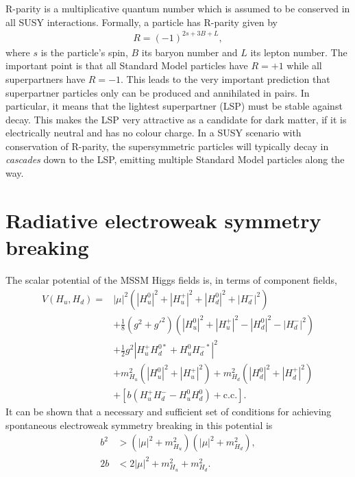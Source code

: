 \documentclass[twoside,english]{uiofysmaster}
\begin{document}
R-parity is a multiplicative quantum number which is assumed to be conserved in all SUSY interactions. Formally, a particle has R-parity given by
\begin{align}
	R = (-1)^{2s + 3B + L},
\end{align}
where $s$ is the particle's spin, $B$ its baryon number and $L$ its lepton number. The important point is that all Standard Model particles have $R=+1$ while all superpartners have $R = -1$. This leads to the very important prediction that superpartner particles only can be produced and annihilated in pairs. In particular, it means that the lightest superpartner (LSP) must be stable against decay. This makes the LSP very attractive as a candidate for dark matter, if it is electrically neutral and has no colour charge. In a SUSY scenario with conservation of R-parity, the supersymmetric particles will typically decay in {\it cascades} down to the LSP, emitting multiple Standard Model particles along the way.

\section{Radiative electroweak symmetry breaking}
The scalar potential of the MSSM Higgs fields is, in terms of component fields,
\begin{align}
	V(H_u, H_d) = 	&|\mu|^2 \left( |H_u^0|^2 + |H_u^+|^2 + |H_d^0|^2 + |H_d^-|^2 \right)\nonumber \\
					&+ \frac{1}{8} \left( g^2 + g'^2 \right) \left( |H_u^0|^2 + |H_u^+|^2 - |H_d^0|^2 - |H_d^-|^2 \right)\nonumber \\
					&+ \frac{1}{2} g^2 |H_u^+ H_d^{0*} + H_u^0 H_d^{-*}|^2\label{eq:mssm_higgspotential}\\
					&+ m_{H_u}^2 \left( |H_u^0|^2 + |H_u^+|^2 \right) + m_{H_d}^2 \left( |H_d^0|^2 + |H_d^+|^2 \right)\nonumber \\
					&+ \left[b\left(H_u^+ H_d^- - H_u^0 H_d^0\right) + \mathrm{c.c.}\right].\nonumber
\end{align}
It can be shown that a necessary and sufficient set of conditions for achieving spontaneous electroweak symmetry breaking in this potential is \cite{Batzing:2013}
\begin{align}
	b^2 &> \left( |\mu|^2 + m_{H_u}^2 \right) \left( |\mu|^2 + m_{H_d}^2 \right),\label{eq:rewsb-cond1}\\
	2b &< 2|\mu|^2 + m_{H_u}^2 + m_{H_d}^2.\label{eq:rewsb-cond2}
\end{align}
\end{document}
